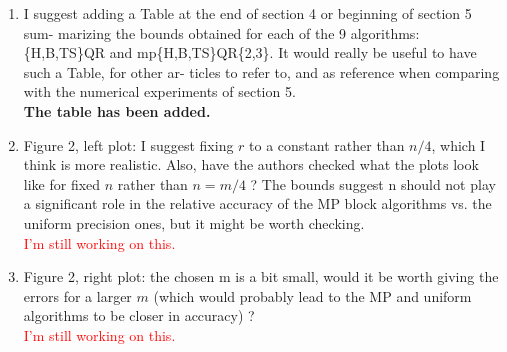 \documentclass[final,onefignum,onetabnum]{siamart190516}
\newcommand{\red}[1]{\textcolor{red}{#1}}
\begin{document}
\begin{enumerate}
\begin{itemize}
        \item Second, for a fixed $r$, (4.11) shows that the loss of accuracy becomes less and less significand as m increases and so asymptotically, regardless of the practical value of $r$, the accuracy eventually will be satisfying. I feel this should be mentioned.
\end{itemize}
{\bf We have discussed the above two points in this part of the discussion.}
\red{Can someone check to see that I addressed these points OK?}
    \item I suggest adding a Table at the end of section 4 or beginning of section 5 sum- marizing the bounds obtained for each of the 9 algorithms: \{H,B,TS\}QR and mp\{H,B,TS\}QR\{2,3\}. It would really be useful to have such a Table, for other ar- ticles to refer to, and as reference when comparing with the numerical experiments of section 5.\\
    {\bf The table has been added.}
    \item Figure 2, left plot: I suggest fixing $r$ to a constant rather than $n/4$, which I think is more realistic. Also, have the authors checked what the plots look like for fixed $n$ rather than $n = m/4$ ? The bounds suggest n should not play a significant role in the relative accuracy of the MP block algorithms vs. the uniform precision ones, but it might be worth checking.\\
    \red{I'm still working on this.}
    \item Figure 2, right plot: the chosen m is a bit small, would it be worth giving the errors for a larger $m$ (which would probably lead to the MP and uniform algorithms to be closer in accuracy) ?\\
    \red{I'm still working on this.}
\end{enumerate}
\end{document}
